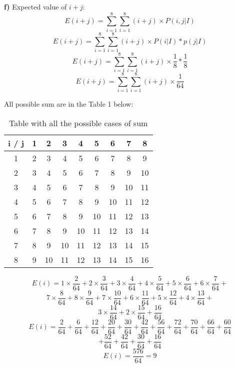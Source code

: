 \documentclass[a4paper, 12pt]{article}
\begin{document}
\begin{flushleft}
\textbf{f)} Expected value of $i+j$:
$$ E(i+j) = \displaystyle\sum_{i=1}^{8}\displaystyle\sum_{i=1}^{8} (i+j) \times P(i,j|I) $$
$$ E(i+j) = \displaystyle\sum_{i=1}^{8}\displaystyle\sum_{i=1}^{8} (i+j) \times P(i|I) \ast p(j|I) $$
$$ E(i+j) = \displaystyle\sum_{i=1}^{8}\displaystyle\sum_{i=1}^{8} (i+j) \times \frac{1}{8} \ast \frac{1}{8} $$
$$ E(i+j) = \displaystyle\sum_{i=1}^{8}\displaystyle\sum_{i=1}^{8} (i+j) \times \frac{1}{64} $$


All possible sum are in the Table 1 below: 

\begin{table}[ht]
    \centering
    \begin{tabular}{| c | c | c | c | c | c | c | c | c | }
        \hline
        i / j    & 1 & 2  & 3  & 4  & 5  & 6 & 7 & 8 \\
        \hline
        1   & 2 & 3  & 4  & 5  & 6  & 7 & 8 & 9\\
        \hline
        2   & 3 & 4 & 5 & 6 & 7  & 8 & 9 & 10\\
        \hline
        3   & 4 & 5 & 6 & 7  & 8 & 9 & 10 & 11\\
        \hline
        4   & 5 & 6 & 7  & 8 & 9 & 10 & 11 & 12\\
        \hline
        5   & 6 & 7  & 8 & 9 & 10 & 11 & 12 & 13\\
        \hline
        6   & 7 & 8  & 9  & 10  & 11 &12 & 13 & 14\\
        \hline
				7   & 8 & 9  & 10  & 11  & 12 &13 & 14 & 15\\
        \hline
				8   & 9 & 10  & 11  & 12  & 13 &14 & 15 & 16\\
        \hline
    \end{tabular}
    \caption{Table with all the possible cases of sum}
    \label{tab:allprob}
\end{table}
$$ E(i) = 1 \times \frac{2}{64} + 2 \times \frac{3}{64} + 3 \times \frac{4}{64} + 4 \times \frac{5}{64} + 5 \times \frac{6}{64} + 6 \times \frac{7}{64} + $$
$$ 7 \times \frac{8}{64} + 8 \times \frac{9}{64} + 7 \times \frac{10}{64} + 6 \times \frac{11}{64} + 5 \times \frac{12}{64} + 4 \times \frac{13}{64} +  $$
$$ 3 \times \frac{14}{64} + 2 \times \frac{15}{64}+ \frac{16}{64}$$
$$ E(i) = \frac{2}{64} + \frac{6}{64} + \frac{12}{64} + \frac{20}{64} + \frac{30}{64} + \frac{42}{64} + \frac{56}{64} + \frac{72}{64} + \frac{70}{64} + \frac{66}{64} + \frac{60}{64} $$
$$ + \frac{52}{64} + \frac{42}{64} + \frac{30}{64} + \frac{16}{64} $$
$$ E(i) = \frac{576}{64} = 9$$ 


\end{flushleft}
\end{document}
